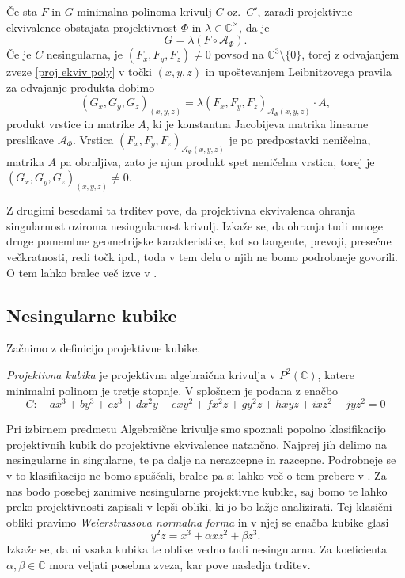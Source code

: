 \documentclass[mat1]{fmfdelo}
\newcommand{\C}{\mathbb C}
\newcommand{\CM}{\mathbb C ^\times}
\newcommand{\PC}{P^2(\mathbb C)}
\theoremstyle{definition}
\begin{document}
\begin{dokaz}
    Če sta $F$ in $G$ minimalna polinoma krivulj $C$ oz.\ $C'$, zaradi projektivne ekvivalence obstajata projektivnost $\Phi$ in $\lambda \in \CM$, da je
    \begin{equation}
        \label{proj ekviv poly}
        G = \lambda (F \circ \mathcal{A}_\Phi).
    \end{equation}
    Če je $C$ nesingularna, je $(F_x, F_y, F_z) \neq 0$ povsod na $\C^3\setminus\{0\}$, torej z odvajanjem zveze \ref{proj ekviv poly} v točki $(x,y,z)$ in upoštevanjem Leibnitzovega pravila za odvajanje produkta dobimo
    \[
        (G_x, G_y, G_z)_{(x,y,z)} = \lambda (F_x, F_y, F_z)_{\mathcal{A}_\Phi (x,y,z)} \cdot A,
    \]
    produkt vrstice in matrike $A$, ki je konstantna Jacobijeva matrika linearne preslikave $\mathcal{A}_\Phi$. Vrstica $(F_x, F_y, F_z)_{\mathcal{A}_\Phi (x,y,z)}$ je po predpostavki neničelna, matrika $A$ pa obrnljiva, zato je njun produkt spet neničelna vrstica, torej je $(G_x, G_y, G_z)_{(x,y,z)} \neq 0$. 
\end{dokaz}

Z drugimi besedami ta trditev pove, da projektivna ekvivalenca ohranja singularnost oziroma nesingularnost krivulj. Izkaže se, da ohranja tudi mnoge druge pomembne geometrijske karakteristike, kot so tangente, prevoji, presečne večkratnosti, redi točk ipd., toda v tem delu o njih ne bomo podrobneje govorili. O tem lahko bralec več izve v \cite{Gibson}.



\subsection{Nesingularne kubike}\label{nesingularne kubike}
Začnimo z definicijo projektivne kubike. 

\begin{definicija}
    \emph{Projektivna kubika} je projektivna algebraična krivulja v $\PC$, katere minimalni polinom je tretje stopnje. 
    V splošnem je podana z enačbo
    \[
        C: \quad ax^3 + by^3 + cz^3 + dx^2y + exy^2 + fx^2z + gy^2z + hxyz + ixz^2 + jyz^2 = 0
    \]
\end{definicija}

Pri izbirnem predmetu Algebraične krivulje smo spoznali popolno klasifikacijo projektivnih kubik do projektivne ekvivalence natančno. Najprej jih delimo na nesingularne in singularne, te pa dalje na nerazcepne in razcepne. Podrobneje se v to klasifikacijo ne bomo spuščali, bralec pa si lahko več o tem prebere v \cite[poglavje 15]{Gibson}.
Za nas bodo posebej zanimive nesingularne projektivne kubike, saj bomo te lahko preko projektivnosti zapisali v lepši obliki, ki jo bo lažje analizirati. Tej klasični obliki pravimo \emph{Weierstrassova normalna forma} in v njej se enačba kubike glasi 
\begin{equation}
    \label{klasicna wnf}
    y^2z = x^3 + \alpha xz^2 + \beta z^3. 
\end{equation}
Izkaže se, da ni vsaka kubika te oblike vedno tudi nesingularna. Za koeficienta $\alpha, \beta \in \C$ mora veljati posebna zveza, kar pove nasledja trditev.
\end{document}
